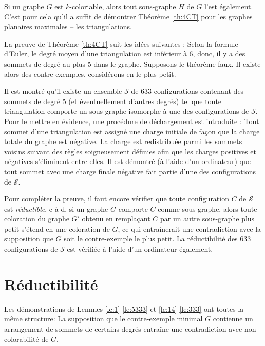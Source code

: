 \documentclass[10pt,a4paper]{article}
\newtheorem{proposition}{Proposition}
\begin{document}
Si un graphe $G$ est $k$-coloriable, alors tout sous-graphe $H$ de $G$ l'est également. C'est pour cela qu'il a suffit de démontrer Théorème \ref{th:4CT} pour les graphes planaires maximales -- les triangulations.




La preuve de Théorème \ref{th:4CT} suit les idées suivantes : Selon la formule d'Euler, le degré moyen d'une triangulation est inférieur à 6, donc, il y a des sommets de degré au plus 5 dans le graphe. Supposons le théorème faux. Il existe alors des contre-exemples, considérons en le plus petit. 

Il est montré qu'il existe un ensemble $\mathcal{S}$ de 633 configurations contenant des sommets de degré 5 (et éventuellement d'autres degrés) tel que toute triangulation comporte un sous-graphe isomorphe à une des configurations de $\mathcal{S}$. Pour le mettre en évidence, une procédure de déchargement est introduite : Tout sommet d'une triangulation est assigné une charge initiale de façon que la charge totale du graphe est négative. La charge est redistribuée parmi les sommets voisins suivant des règles soigneusement définies afin que les charges positives et négatives s'éliminent entre elles. Il est démontré (à l'aide d'un ordinateur) que tout sommet avec une charge finale négative fait partie d'une des configurations de $\mathcal{S}$.

Pour compléter la preuve, il faut encore vérifier que toute configuration $C$ de $\mathcal{S}$ est \emph{réductible}, c-à-d, si un graphe $G$ comporte $C$ comme sous-graphe, alors toute coloration du graphe $G'$ obtenu en remplaçant $C$ par un autre sous-graphe plus petit s'étend en une coloration de $G$, ce qui entraînerait une contradiction avec la supposition que $G$ soit le contre-exemple le plus petit.
La réductibilité des 633 configurations de $\mathcal{S}$ est vérifiée à l'aide d'un ordinateur également.

\newpage





\section{Réductibilité}
\label{chap:red}
Les démonstrations de Lemmes \ref{le:1}-\ref{le:5333} et \ref{le:14}-\ref{le:333} ont toutes la même structure: La supposition que le contre-exemple minimal $G$ contienne un arrangement de sommets de certains degrés entraîne une contradiction avec non-colorabilité de $G$.
  
\end{document}
